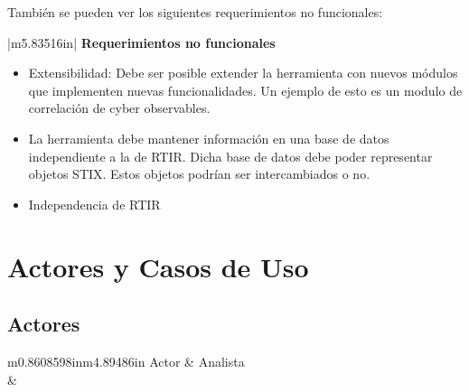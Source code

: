 \documentclass[11pt]{article}
\makeatletter
\newcommand\arraybslash{\let\\\@arraycr}
\makeatother
\begin{document}
\bigskip

También se pueden ver los siguientes requerimientos no funcionales:


\bigskip

\begin{flushleft}
\tablefirsthead{}
\tablehead{}
\tabletail{}
\tablelasttail{}
\begin{supertabular}{|m{5.83516in}|}
\hline
\centering\arraybslash{\bfseries\color{black} Requerimientos no funcionales}\\\hline
\liststyleWWNumiii
\begin{itemize}
\item { Extensibilidad: Debe ser posible extender la herramienta con nuevos módulos que
implementen nuevas funcionalidades. Un ejemplo de esto es un modulo de correlación de cyber observables.}
\item { La herramienta debe mantener información en una base de datos independiente a la de
RTIR. Dicha base de datos debe poder representar objetos STIX. Estos objetos podrían ser intercambiados o no.}
\item { Independencia de RTIR}
\end{itemize}
\\\hline
\end{supertabular}
\end{flushleft}

\bigskip


\bigskip


\bigskip


\bigskip

\section{Actores y Casos de Uso}
\subsection{Actores}

\bigskip

\begin{flushleft}
\tablefirsthead{}
\tablehead{}
\tabletail{}
\tablelasttail{}
\begin{supertabular}{m{0.8608598in}m{4.89486in}}
{\color{black} Actor} &
{\color{black} Analista}\\\hline
{} &
\\
\end{supertabular}
\end{flushleft}
\end{document}
